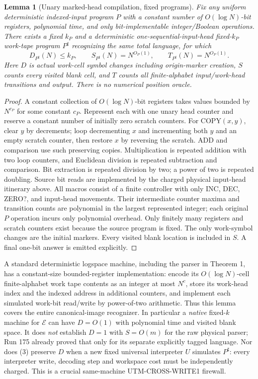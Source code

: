 \documentclass[11pt]{article}
\newtheorem{lemma}[theorem]{Lemma}
\begin{document}
\begin{lemma}[Unary marked-head compilation, fixed programs]
Fix any uniform deterministic indexed-input program
$P$ with a \emph{constant} number of $O(\log N)$-bit
registers, polynomial time, and only bit-implementable
integer/Boolean operations. There exists a fixed $k_P$
and a deterministic one-sequential-input-head
fixed-$k_P$ work-tape program $P^\sharp$ recognizing
the same total language, for which
\[
 D_{P^\sharp}(N)\le k_P,\qquad
 S_{P^\sharp}(N)=N^{O_P(1)},\qquad
 T_{P^\sharp}(N)=N^{O_P(1)}.                         \tag{3}
\]
Here $D$ is \emph{actual} work-cell symbol changes
including origin-marker creation, $S$ counts
\emph{every visited blank cell}, and $T$ counts
all finite-alphabet input/work-head transitions
and output. There is no numerical position oracle.
\end{lemma}
\begin{proof}
A constant collection of $O(\log N)$-bit registers
takes values bounded by $N^{c_P}$ for some constant
$c_P$. Represent each with one unary head counter
and reserve a constant number of initially zero
scratch counters. For COPY$(x,y)$, clear $y$ by
decrements; loop decrementing $x$ and incrementing
both $y$ and an empty scratch counter, then restore
$x$ by reversing the scratch. ADD and comparison use
such preserving copies. Multiplication is repeated
addition with two loop counters, and Euclidean division
is repeated subtraction and comparison. Bit extraction
is repeated division by two; a power of two is
repeated doubling. Source bit reads are implemented
by the charged physical input-head itinerary above.
All macros consist of a finite controller with only
INC, DEC, ZERO?, and input-head movements. Their
intermediate counter maxima and transition counts
are polynomial in the largest represented integer;
each original $P$ operation incurs only polynomial
overhead. Only finitely many registers and scratch
counters exist because the source program is fixed.
The only work-symbol changes are the initial markers.
Every visited blank location is included in $S$.
A final one-bit answer is emitted explicitly.
\end{proof}
A standard deterministic logspace machine, including
the parser in Theorem 1, has a constant-size
bounded-register implementation: encode its
$O(\log N)$-cell finite-alphabet work tape contents
as an integer at most $N^{c}$, store its work-head
index and the indexed address in additional counters,
and implement each simulated work-bit read/write
by power-of-two arithmetic. Thus this lemma covers
the entire canonical-image recognizer. In
particular a \emph{native} fixed-$k$ machine for
$\mathcal E$ can have $D=O(1)$ with polynomial
time and visited blank space. It does \emph{not}
establish $D=1$ with $S=O(m)$ for the raw physical
parser; Run 175 already proved that only for its
separate explicitly tagged language.
Nor does (3) preserve $D$ when a new fixed universal
interpreter $U$ simulates $P^\sharp$: every interpreter
write, decoding step and workspace cost must
be independently charged. This is a crucial
same-machine UTM-CROSS-WRITE1 firewall.
\end{document}
